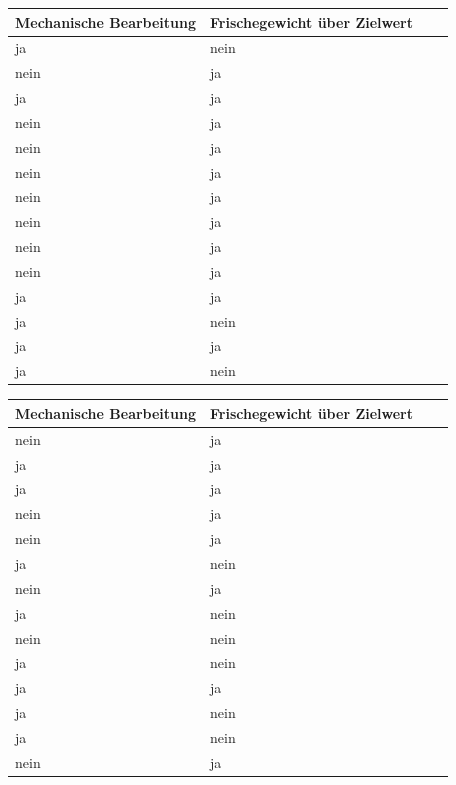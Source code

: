 \documentclass[a4paper, 9pt]{scrartcl}\usepackage[]{graphicx}\usepackage[]{xcolor}
\begin{document}
\begin{center}
\begin{minipage}[t]{0.45\textwidth}
\begin{center}

\begin{tabular}{p{2.5cm}p{2.5cm}p{2.5cm}p{2.5cm}}
\toprule
Mechanische Bearbeitung & Frischegewicht über Zielwert\\
\midrule
ja & nein\\
nein & ja\\
ja & ja\\
nein & ja\\
nein & ja\\
\addlinespace
nein & ja\\
nein & ja\\
nein & ja\\
nein & ja\\
nein & ja\\
\addlinespace
ja & ja\\
ja & nein\\
ja & ja\\
ja & nein\\
\bottomrule
\end{tabular}


\end{center}
\end{minipage}
\begin{minipage}[t]{0.45\textwidth}
\begin{center}

\begin{tabular}{p{2.5cm}p{2.5cm}p{2.5cm}p{2.5cm}}
\toprule
Mechanische Bearbeitung & Frischegewicht über Zielwert\\
\midrule
nein & ja\\
ja & ja\\
ja & ja\\
nein & ja\\
nein & ja\\
\addlinespace
ja & nein\\
nein & ja\\
ja & nein\\
nein & nein\\
ja & nein\\
\addlinespace
ja & ja\\
ja & nein\\
ja & nein\\
nein & ja\\
\bottomrule
\end{tabular}


\end{center}
\end{minipage}
\end{center}
\end{document}
